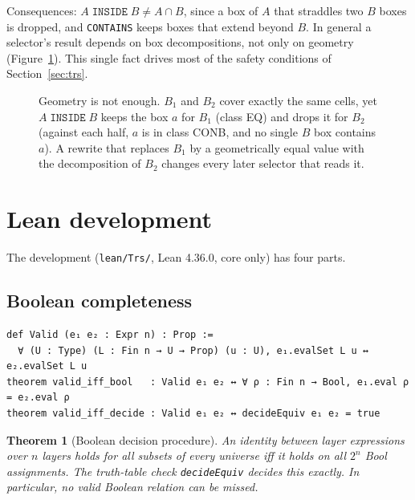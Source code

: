 \documentclass[11pt]{article}
\newtheorem{theorem}{Theorem}
\newcommand{\op}[1]{\texttt{#1}}
\begin{document}
Consequences: $A\;\op{INSIDE}\;B \neq A\cap B$, since a box of $A$ that straddles two $B$ boxes is dropped, and \op{CONTAINS} keeps boxes that extend beyond $B$. In general a selector's result depends on box decompositions, not only on geometry (Figure~\ref{fig:decomp}). This single fact drives most of the safety conditions of Section~\ref{sec:trs}.

\begin{figure}[t]
\centering
{}
\caption{Geometry is not enough. $B_1$ and $B_2$ cover exactly the same cells, yet $A\;\op{INSIDE}\;B$ keeps the box $a$ for $B_1$ (class EQ) and drops it for $B_2$ (against each half, $a$ is in class CONB, and no single $B$ box contains $a$). A rewrite that replaces $B_1$ by a geometrically equal value with the decomposition of $B_2$ changes every later selector that reads it.}
\label{fig:decomp}
\end{figure}

\section{Lean development}\label{sec:lean}
The development (\texttt{lean/Trs/}, Lean 4.36.0, core only) has four parts.

\subsection{Boolean completeness}
\begin{lstlisting}[language=Lean]
def Valid (e₁ e₂ : Expr n) : Prop :=
  ∀ (U : Type) (L : Fin n → U → Prop) (u : U), e₁.evalSet L u ↔ e₂.evalSet L u
theorem valid_iff_bool   : Valid e₁ e₂ ↔ ∀ ρ : Fin n → Bool, e₁.eval ρ = e₂.eval ρ
theorem valid_iff_decide : Valid e₁ e₂ ↔ decideEquiv e₁ e₂ = true
\end{lstlisting}
\begin{theorem}[Boolean decision procedure]
An identity between layer expressions over $n$ layers holds for all subsets of every universe iff it holds on all $2^n$ Bool assignments. The truth-table check \texttt{decideEquiv} decides this exactly. In particular, no valid Boolean relation can be missed.
\end{theorem}
\end{document}
